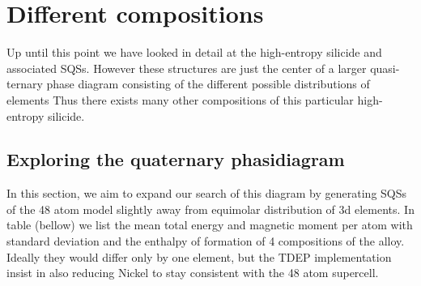 \chapter{Different compositions}
\label{sec:comps}

Up until this point we have looked in detail at the high-entropy silicide  and associated SQSs. However these structures are just the center of a larger quasi-ternary phase diagram consisting of the different possible distributions of elements Thus there exists many other compositions of this particular high-entropy silicide. 

\section{Exploring the quaternary phasidiagram}
In this section, we aim to expand our search of this diagram by generating SQSs of the 48 atom model slightly away from equimolar distribution of 3d elements. In table (bellow) we list the mean total energy and magnetic moment per atom with standard deviation and the enthalpy of formation of 4 compositions of the  alloy. Ideally they would differ only by one element, but the TDEP implementation insist in also reducing Nickel to stay consistent with the 48 atom supercell. 

